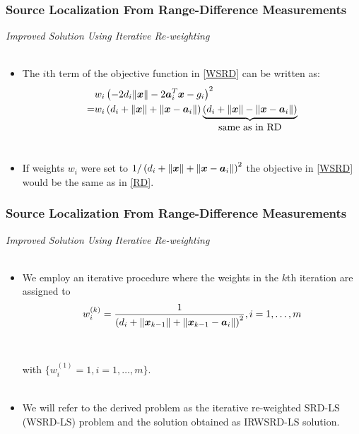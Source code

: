 \documentclass [t] {beamer} %
\begin{document}
\begin{frame} %
\frametitle{Source Localization From Range-Difference Measurements} %
{\large \textit{Improved Solution Using Iterative Re-weighting}} 
\\~\\
\normalsize
\begin{itemize}
\item <1->
The $i$th term of the objective function in \eqref{WSRD} can be written as:
\begin{equation}
\nonumber
\begin{aligned}
&w_i\left(-2d_i\|\mbox{\boldmath$x$}\|-2\mbox{\boldmath$a$}_i^T\mbox{\boldmath$x$}-g_i\right)^2 \\
=&w_i\left(d_i+\|\mbox{\boldmath$x$}\|+\|\mbox{\boldmath$x$}-\mbox{\boldmath$a$}_i\|\right)\underbrace{\left(d_i+\|\mbox{\boldmath$x$}\|-\|\mbox{\boldmath$x$}-\mbox{\boldmath$a$}_i\|\right)}_{\mbox{same as in RD}}
\end{aligned}
\end{equation}
\\

\phantom{m} 
\item 
If weights $w_i$ were set to $1/\left(d_i+\|\mbox{\boldmath$x$}\|+\|\mbox{\boldmath$x$}-\mbox{\boldmath$a$}_i\|\right)^2$  the objective in \eqref{WSRD} would be the same as in \eqref{RD}. 
\end{itemize}
\end{frame}



\begin{frame} %
\frametitle{Source Localization From Range-Difference Measurements} %
{\large \textit{Improved Solution Using Iterative Re-weighting}} 
\\~\\
\normalsize
\begin{itemize}
\item 
We employ an iterative procedure  where the weights in the $k$th iteration are assigned to 
\begin{equation} 
\nonumber
w_i^{(k)}=\frac{1}{\left(d_i+\|\mbox{\boldmath$x$}_{k-1}\|+\|\mbox{\boldmath$x$}_{k-1}-\mbox{\boldmath$a$}_i\|\right)^2}, i=1,\ldots,m
\end{equation} \\~\\
with $\{w_i^{(1)} = 1, i=1,\ldots, m\}$.
 \\~\\
\item 
We will refer to the derived problem as the iterative re-weighted SRD-LS (WSRD-LS) problem and the solution obtained as IRWSRD-LS solution. 

\end{itemize}
\end{frame}
\end{document}

